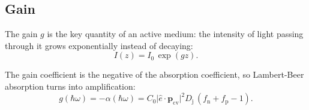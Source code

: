 \subsection{Gain}

The gain $g$ is the key quantity of an active medium: the intensity of light passing
through it grows exponentially instead of decaying:
\begin{equation}
	I(z)=I_{0}\, \exp(g z).
\end{equation}


The gain coefficient is the negative of the absorption coefficient, so Lambert-Beer
absorption turns into amplification:
\begin{equation}
	g(\hbar\omega)=-\alpha(\hbar\omega)=C_{0}\lvert \hat{e}\cdot\mathbf{p}_{\mathrm{cv}}
	\rvert^{2}D_{\mathrm{j}}\,(f_{\mathrm{n}}+f_{\mathrm{p}}-1).
\end{equation}


